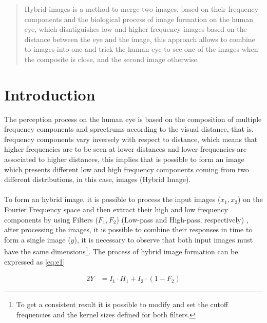 \documentclass{article}
\begin{document}

\begin{abstract}
    Hybrid images is a method to merge two images, based on their frequency components and the biological process of image formation on the human eye, which disntiguishes low and higher frequency images based on the distance between the eye and the image, this approach allows to combine to images into one and trick the human eye to see one of the images when the composite is close, and the second image otherwise. 
\end{abstract}


\section{Introduction}
The perception process on the human eye is based on the composition of multiple frequency components and sprectrums according to the visual distance, that is, frequency components vary inversely with respect to distance, which means that higher frequencies are to be seen at lower distances and lower frequencies are associated to higher distances, this implies that is possible to form an image which presents different low and high frequency components coming from two different distributions, in this case, images (Hybrid Image).
\\
\\
To form an hybrid image, it is possible to process the input images ($x_1, x_2$) on the Fourier Frequency space and then extract their high and low frequency components by using Filters ($F_1, F_2$) (Low-pass and High-pass, respectively) \cite{Oliva:2006:HI:1141911.1141919}, after processing the images, it is possible to combine their responses in time to form a single image ($y$), it is necessary to observe that both input images must have the same dimensions\footnote{To get a consistent result it is possible to modify and set the cutoff frequencies and the kernel sizes defined for both filters.}. The process of hybrid image formation can be expressed as \eqref{eq:e1}

\begin{alignat}{2}
Y &= I_1 \cdot H_1 + I_2 \cdot (1 - F_2) \label{eq:e1}
\end{alignat}
\end{document}
